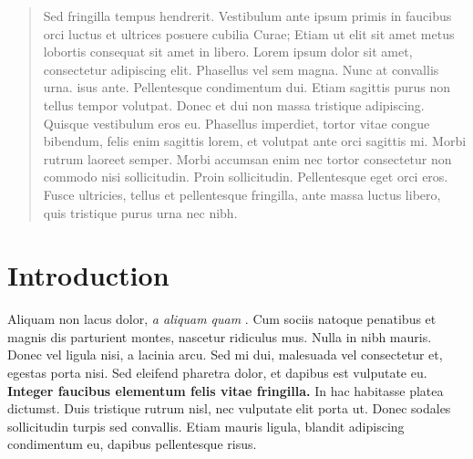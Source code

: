 \documentclass[a0,portrait]{a0poster}
\begin{document}
\begin{multicols}{2} %


\color{Navy} %

\begin{abstract}

Sed fringilla tempus hendrerit. Vestibulum ante ipsum primis in faucibus orci luctus et ultrices posuere cubilia Curae; Etiam ut elit sit amet metus lobortis consequat sit amet in libero. Lorem ipsum dolor sit amet, consectetur adipiscing elit. Phasellus vel sem magna. Nunc at convallis urna. isus ante. Pellentesque condimentum dui. Etiam sagittis purus non tellus tempor volutpat. Donec et dui non massa tristique adipiscing. Quisque vestibulum eros eu. Phasellus imperdiet, tortor vitae congue bibendum, felis enim sagittis lorem, et volutpat ante orci sagittis mi. Morbi rutrum laoreet semper. Morbi accumsan enim nec tortor consectetur non commodo nisi sollicitudin. Proin sollicitudin. Pellentesque eget orci eros. Fusce ultricies, tellus et pellentesque fringilla, ante massa luctus libero, quis tristique purus urna nec nibh.

\end{abstract}


\color{SaddleBrown} %

\section*{Introduction}

Aliquam non lacus dolor, \textit{a aliquam quam} \cite{Smith:2012qr}. Cum sociis natoque penatibus et magnis dis parturient montes, nascetur ridiculus mus. Nulla in nibh mauris. Donec vel ligula nisi, a lacinia arcu. Sed mi dui, malesuada vel consectetur et, egestas porta nisi. Sed eleifend pharetra dolor, et dapibus est vulputate eu. \textbf{Integer faucibus elementum felis vitae fringilla.} In hac habitasse platea dictumst. Duis tristique rutrum nisl, nec vulputate elit porta ut. Donec sodales sollicitudin turpis sed convallis. Etiam mauris ligula, blandit adipiscing condimentum eu, dapibus pellentesque risus.


\end{multicols}
\end{document}
